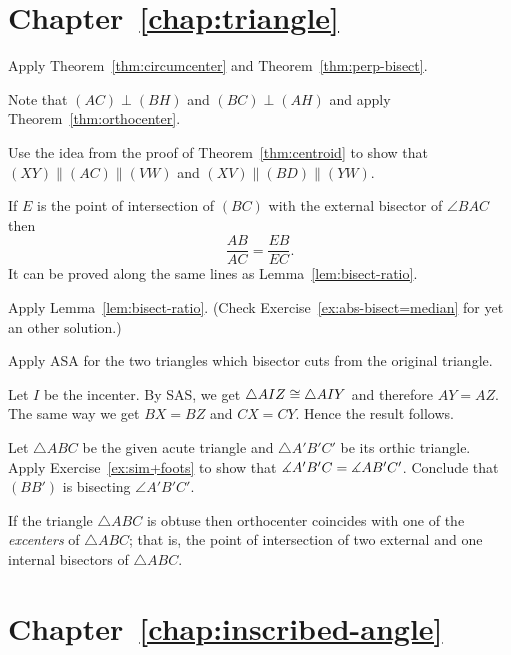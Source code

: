 \section*{Chapter~\ref{chap:triangle}}
\setcounter{eqtn}{0}

Apply Theorem~\ref{thm:circumcenter} and Theorem~\ref{thm:perp-bisect}.


Note that $(AC)\perp (BH)$ and $(BC)\perp (AH)$ and apply Theorem~\ref{thm:orthocenter}.


Use the idea from the proof of Theorem~\ref{thm:centroid}
to show that $(XY)\parallel (AC)\parallel (VW)$ and
$(XV)\parallel (BD)\parallel (YW)$.


If $E$ is the point of intersection of $(BC)$ 
with the external bisector of $\angle BAC$
then 
$$\frac{AB}{AC}=\frac{EB}{EC}.$$
It can be proved along the same lines as Lemma~\ref{lem:bisect-ratio}.

Apply Lemma~\ref{lem:bisect-ratio}.
(Check Exercise~\ref{ex:abs-bisect=median} for yet an other solution.)


Apply ASA for the two triangles which bisector cuts from the original triangle. 

Let $I$ be the incenter.
By SAS, we get $\triangle AIZ\z\cong\triangle AIY$ and therefore $AY=AZ$.
The same way we get $BX=BZ$ and $CX=CY$.
Hence the result follows.

Let $\triangle ABC$ be the given acute triangle and $\triangle A'B'C'$ 
be its orthic triangle.
Apply Exercise~\ref{ex:sim+foots} to show that 
$\measuredangle A'B'C\z=\measuredangle AB'C'$.
Conclude that $(BB')$ is bisecting $\angle A'B'C'$.

If the triangle $\triangle ABC$ is obtuse 
then orthocenter coincides with one of the \emph{excenters} of $\triangle ABC$;
that is, 
the point of intersection of two external and one internal bisectors of $\triangle ABC$.
 

 

\section*{Chapter~\ref{chap:inscribed-angle}}
\setcounter{eqtn}{0}


